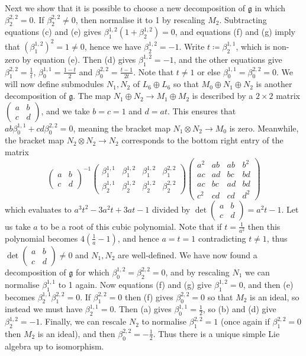 \documentclass[11pt,a4paper,reqno]{amsart}
\theoremstyle{definition}
\numberwithin{equation}{section}
\newcommand{\fg}{\mathfrak{g}}
\newcommand{\sM}[1]{\left(\begin{smallmatrix}#1\end{smallmatrix}\right)}
\begin{document}
\begin{enumerate}
Next we show that it is possible to choose a new decomposition of $\fg$ in which $\beta^{2,2}_2=0$. If $\beta^{2,2}_2\neq0$, then normalise it to 1 by rescaling $M_2$. Subtracting equations (c) and (e) gives $\beta^{1,2}_1(1+\beta^{1,2}_2)=0$, and equations (f) and (g) imply that $(\beta^{1,2}_1)^2=1\neq0$, hence we have $\beta^{1,2}_2=-1$. Write $t\coloneqq\beta^{1,1}_2$, which is non-zero by equation (e). Then (d) gives $\beta^{1,2}_1=-1$, and the other equations give $\beta^{2,2}_1=\frac1t$, $\beta^{1,1}_0=\frac{1-t}2$ and $\beta^{2,2}_0=\frac{t-1}{2t}$. Note that $t\neq1$ or else $\beta^{1,1}_0=\beta^{2,2}_0=0$. We will now define submodules $N_1,N_2$ of $L_6\oplus L_6$ so that $M_0\oplus N_1\oplus N_2$ is another decomposition of $\fg$. The map $N_1\oplus N_2\to M_1\oplus M_2$ is described by a $2\times2$ matrix $\sM{a&b\\c&d}$, and we take $b=c=1$ and $d=at$. This ensures that $ab\beta^{1,1}_0+cd\beta^{2,2}_0=0$, meaning the bracket map $N_1\otimes N_2\to M_0$ is zero. Meanwhile, the bracket map $N_2\otimes N_2\to N_2$ corresponds to the bottom right entry of the matrix
\[\begin{pmatrix}a&b\\c&d\end{pmatrix}^{-1}\begin{pmatrix}\beta^{1,1}_1&\beta^{1,2}_1&\beta^{1,2}_1&\beta^{2,2}_1\\\beta^{1,1}_2&\beta^{1,2}_2&\beta^{1,2}_2&\beta^{2,2}_2\end{pmatrix}\begin{pmatrix}a^2&ab&ab&b^2\\ac&ad&bc&bd\\ac&bc&ad&bd\\c^2&cd&cd&d^2\end{pmatrix}\]
which evaluates to $a^3t^2-3a^2t+3at-1$ divided by $\det\sM{a&b\\c&d}=a^2t-1$. Let us take $a$ to be a root of this cubic polynomial. Note that if $t=\frac1{a^2}$ then this polynomial becomes $4(\frac1a-1)$, and hence $a=t=1$ contradicting $t\neq1$, thus $\det\sM{a&b\\c&d}\neq0$ and $N_1,N_2$ are well-defined. We have now found a decomposition of $\fg$ for which $\beta^{1,2}_0=\beta^{2,2}_2=0$, and by rescaling $N_1$ we can normalise $\beta^{1,1}_1$ to 1 again. Now equations (f) and (g) give $\beta^{1,2}_1=0$, and then (e) becomes $\beta^{1,1}_2\beta^{2,2}_1=0$. If $\beta^{2,2}_1=0$ then (f) gives $\beta^{2,2}_0=0$ so that $M_2$ is an ideal, so instead we must have $\beta^{1,1}_2=0$. Then (a) gives $\beta^{1,1}_0=\frac12$, so (b) and (d) give $\beta^{1,2}_2=-1$. Finally, we can rescale $N_2$ to normalise $\beta^{2,2}_1=1$ (once again if $\beta^{2,2}_1=0$ then $M_2$ is an ideal), and then $\beta^{2,2}_0=-\frac12$. Thus there is a unique simple Lie algebra up to isomorphism.


\end{enumerate}
\end{document}
